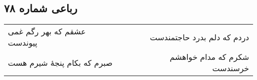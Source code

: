 \begin{center}
\section*{رباعی شماره ۷۸}
\label{sec:sh078}
\begin{longtable}{l p{0.5cm} r}
عشقم که بهر رگم غمی پیوندست
&&
دردم که دلم بدرد حاجتمندست
\\
صبرم که بکام پنجهٔ شیرم هست
&&
شکرم که مدام خواهشم خرسندست
\\
\end{longtable}
\end{center}
